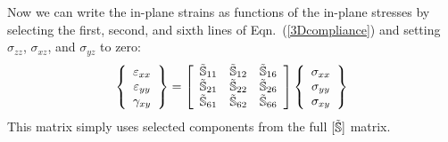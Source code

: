 \documentclass[11pt]{article}
\begin{document}
Now we can write the in-plane strains as functions of the in-plane stresses by selecting the first, second, and sixth lines of Eqn.~(\ref{3Dcompliance}) and setting $\sigma_{zz}$, $\sigma_{xz}$, and $\sigma_{yz}$ to zero:
\begin{equation}
        \left\{ \begin{array}{c}
           \varepsilon_{xx}  \\  \varepsilon_{yy}  \\  \gamma_{xy}
           \end{array} \right\}
           =
              \left[ \begin{array}{ccc}
     \tilde{\mathbb{S}}_{11} &  \tilde{\mathbb{S}}_{12} &   \tilde{\mathbb{S}}_{16} \\
     \tilde{\mathbb{S}}_{21} &  \tilde{\mathbb{S}}_{22} &   \tilde{\mathbb{S}}_{26} \\
     \tilde{\mathbb{S}}_{61} &  \tilde{\mathbb{S}}_{62} &   \tilde{\mathbb{S}}_{66} 
    \end{array} \right] 
    \left\{ \begin{array}{c}
           \sigma_{xx}  \\  \sigma_{yy}  \\   \sigma_{xy}
           \end{array} \right\}
     \label{2Dcompliance}
 \end{equation}
 This matrix simply uses selected components from the full $[ \tilde{\mathbb{S}} ]$ matrix.  
 
\end{document}
